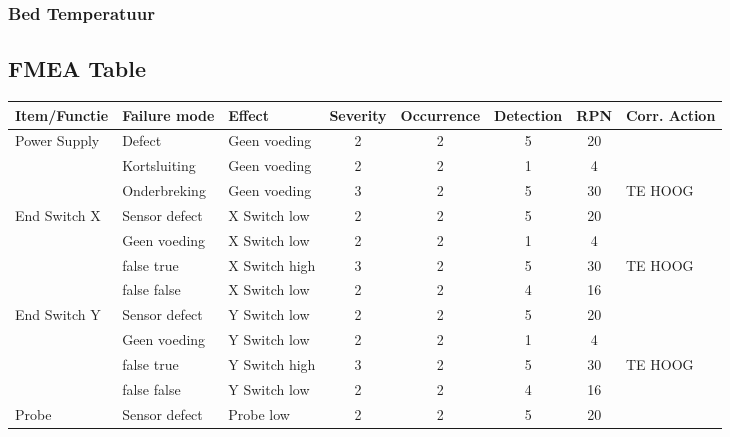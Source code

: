 \documentclass{article}
\begin{document}
\subsubsection*{Bed Temperatuur}

\newpage
\begin{landscape}
    \subsection{FMEA Table} 
    \begin{longtable}{|l|l|l|c|c|c|c|l|}
        \hline
        \textbf{Item/Functie} & \textbf{Failure mode} & \textbf{Effect} & \textbf{Severity} & \textbf{Occurrence} & \textbf{Detection} & \textbf{RPN} & \textbf{Corr. Action} \\ \hline
        \multirow{3}{*}{Power Supply}       & Defect            & Geen voeding  & 2 & 2 & 5 & 20 & \\
                                            & Kortsluiting      & Geen voeding  & 2 & 2 & 1 &  4 & \\
                                            & Onderbreking      & Geen voeding  & 3 & 2 & 5 & 30 & TE HOOG \\
                                            \hline
        \multirow{4}{*}{End Switch X}       & Sensor defect     & X Switch low  & 2 & 2 & 5 & 20 & \\
                                            & Geen voeding      & X Switch low  & 2 & 2 & 1 &  4 & \\
                                            & false true        & X Switch high & 3 & 2 & 5 & 30 & TE HOOG \\
                                            & false false       & X Switch low  & 2 & 2 & 4 & 16 & \\ 
                                            \hline
        \multirow{4}{*}{End Switch Y}       & Sensor defect     & Y Switch low  & 2 & 2 & 5 & 20 & \\
                                            & Geen voeding      & Y Switch low  & 2 & 2 & 1 &  4 & \\
                                            & false true        & Y Switch high & 3 & 2 & 5 & 30 & TE HOOG \\
                                            & false false       & Y Switch low  & 2 & 2 & 4 & 16 & \\ 
                                            \hline
        \multirow{4}{*}{Probe}              & Sensor defect     & Probe low  & 2 & 2 & 5 & 20 & \\

\end{longtable}
\end{landscape}
\end{document}
